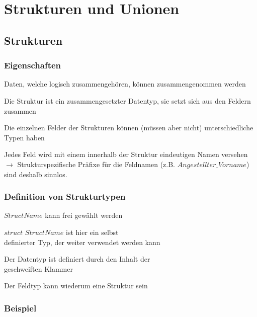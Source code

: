 \section{Strukturen und Unionen}
	\subsection{Strukturen}
		\subsubsection{Eigenschaften}
			\begin{compactitem}
				\item Daten, welche logisch zusammengehören, können zusammengenommen werden
				\item Die Struktur ist ein zusammengesetzter Datentyp, sie setzt sich aus den Feldern zusammen
				\item Die einzelnen Felder der Strukturen können (müssen aber nicht) unterschiedliche Typen haben
				\item Jedes Feld wird mit einem innerhalb der Struktur eindeutigen Namen versehen $\rightarrow$ Strukturspezifische Präfixe für die Feldnamen (z.B. $Angestellter\_Vorname$) sind deshalb sinnlos. 
			\end{compactitem}
		
	\begin{minipage}[t]{10 cm}
		\subsubsection{Definition von Strukturtypen}
			\vspace*{-0.2cm}
			
			\vspace*{0.3cm}
			\begin{compactitem}
				\item $StructName$ kann frei gewählt werden
				\item $struct$ $StructName$ ist hier ein selbst\\ definierter Typ, der weiter verwendet werden kann
				\item Der Datentyp ist definiert durch den Inhalt der\\ geschweiften Klammer
				\item Der Feldtyp kann wiederum eine Struktur sein
			\end{compactitem}
	\end{minipage}
		\hspace*{0.5cm}	
	\begin{minipage}[t]{8 cm}
		\subsubsection{Beispiel}
			\vspace*{-0.2cm}
			
	\end{minipage}
	
